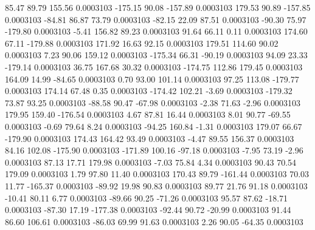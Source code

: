        85.47       89.79      155.56     0.0003103
     -175.15       90.08     -157.89     0.0003103
      179.53       90.89     -157.85     0.0003103
      -84.81       86.87       73.79     0.0003103
      -82.15       22.09       87.51     0.0003103
      -90.30       75.97     -179.80     0.0003103
       -5.41      156.82       89.23     0.0003103
       91.64       66.11        0.11     0.0003103
      174.60       67.11     -179.88     0.0003103
      171.92       16.63       92.15     0.0003103
      179.51      114.60       90.02     0.0003103
        7.23       90.06      159.12     0.0003103
     -175.34       66.31      -90.19     0.0003103
       94.09       23.33     -179.14     0.0003103
       36.75      167.68       30.32     0.0003103
     -174.75      112.86      179.45     0.0003103
      164.09       14.99      -84.65     0.0003103
        0.70       93.00      101.14     0.0003103
       97.25      113.08     -179.77     0.0003103
      174.14       67.48        0.35     0.0003103
     -174.42      102.21       -3.69     0.0003103
     -179.32       73.87       93.25     0.0003103
      -88.58       90.47      -67.98     0.0003103
       -2.38       71.63       -2.96     0.0003103
      179.95      159.40     -176.54     0.0003103
        4.67       87.81       16.44     0.0003103
        8.01       90.77      -69.55     0.0003103
       -0.69       79.64        8.24     0.0003103
      -94.25      160.84       -1.31     0.0003103
      179.07       66.67     -179.90     0.0003103
      174.43      164.42       93.49     0.0003103
       -4.47       89.55      156.37     0.0003103
       84.16      102.08     -175.90     0.0003103
     -171.89      100.16      -97.18     0.0003103
       -7.95       73.19       -2.96     0.0003103
       87.13       17.71      179.98     0.0003103
       -7.03       75.84        4.34     0.0003103
       90.43       70.54      179.09     0.0003103
        1.79       97.80       11.40     0.0003103
      170.43       89.79     -161.44     0.0003103
       70.03       11.77     -165.37     0.0003103
      -89.92       19.98       90.83     0.0003103
       89.77       21.76       91.18     0.0003103
      -10.41       80.11        6.77     0.0003103
      -89.66       90.25      -71.26     0.0003103
       95.57       87.62      -18.71     0.0003103
      -87.30       17.19     -177.38     0.0003103
      -92.44       90.72      -20.99     0.0003103
       91.44       86.60      106.61     0.0003103
      -86.03       69.99       91.63     0.0003103
        2.26       90.05      -64.35     0.0003103
